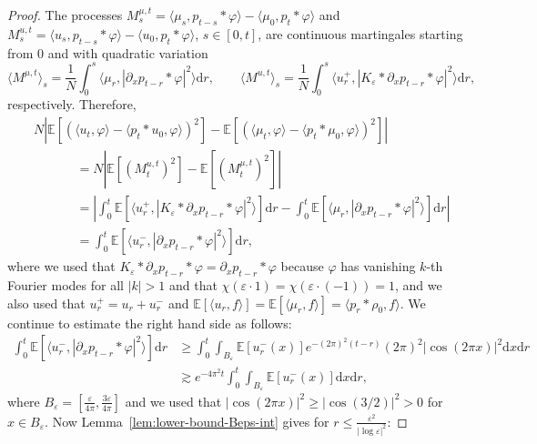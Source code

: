 \documentclass[a4paper,12pt]{article}
\newcommand{\mathd}{\mathrm{d}}
\newcommand{\E}{\mathbb{E}}
\begin{document}
\begin{proof}
    The processes $M^{\mu,t}_s = \langle \mu_s, p_{t-s}\ast \varphi\rangle - \langle \mu_0, p_t \ast \varphi\rangle$ and $M^{u,t}_s = \langle u_s, p_{t-s}\ast \varphi\rangle - \langle u_0, p_t \ast \varphi\rangle$, $s \in [0,t]$, are continuous martingales starting from $0$ and with quadratic variation
    \[
        \langle M^{\mu,t}\rangle_s = \frac1N \int_0^s \langle \mu_r, |\partial_x p_{t-r}\ast \varphi|^2\rangle \mathd r,\qquad \langle M^{u,t}\rangle_s = \frac1N \int_0^s \langle u^+_r, |K_\varepsilon\ast \partial_x p_{t-r}\ast \varphi|^2\rangle \mathd r,
    \]
    respectively. Therefore,
    \begin{align}\nonumber
        & N|\E[(\langle u_t,\varphi\rangle - \langle p_t \ast u_0, \varphi\rangle)^2] - \E[(\langle \mu_t, \varphi\rangle - \langle p_t \ast \mu_0, \varphi\rangle)^2]| \\
        &\hspace{40pt} = N|\E[(M^{u,t}_t)^2] - \E[(M^{\mu,t}_t)^2]| \nonumber \\
        &\hspace{40pt} = \left| \int_0^t \E[\langle u^+_r, |K_\varepsilon\ast \partial_x p_{t-r}\ast \varphi|^2\rangle] \mathd r - \int_0^t \E[\langle \mu_r, |\partial_x p_{t-r}\ast \varphi|^2\rangle] \mathd r\right| \nonumber \\
        & \hspace{40pt} = \int_0^t \E[\langle u^-_r, |\partial_x p_{t-r}\ast \varphi|^2\rangle] \mathd r, \label{eq:lower-bound-pr1}
    \end{align}
    where we used that $K_\varepsilon\ast \partial_x p_{t-r} \ast \varphi =  \partial_x p_{t-r} \ast \varphi$ because $\varphi$  has vanishing $k$-th Fourier modes for all $|k|>1$ and that $\chi(\varepsilon \cdot 1) = \chi(\varepsilon \cdot(-1))= 1$, and we also used that $u_r^+ = u_r + u_r^-$ and $\E[\langle u_r, f\rangle] = \E[\langle \mu_r,f\rangle] = \langle p_r\ast \rho_0, f\rangle$. We continue to estimate the right hand side as follows:
    \begin{align} \nonumber
        \int_0^t \E[\langle u^-_r, |\partial_x p_{t-r}\ast \varphi|^2\rangle] \mathd r & \geq \int_0^t \int_{B_\varepsilon} \E[u^-_r(x)] e^{-(2\pi)^2(t-r)} (2\pi)^2 |\cos(2\pi x)|^2 \mathd x \mathd r \\
        & \gtrsim e^{-4\pi^2 t}\int_0^t \int_{B_\varepsilon} \E[u^-_r(x)]  \mathd x \mathd r, \label{eq:lower-bound-pr2}
    \end{align}
    where $B_\varepsilon = [\tfrac{\varepsilon}{4\pi}, \tfrac{3\varepsilon}{4\pi}]$ and we used that $|\cos(2\pi x)|^2 \geq |\cos(3/2)|^2 >0$ for $x \in B_\varepsilon$. Now  Lemma~\ref{lem:lower-bound-Beps-int} gives for     $r \leq \frac{\varepsilon^2}{|\log \varepsilon|^2}$:

\end{proof}
\end{document}
